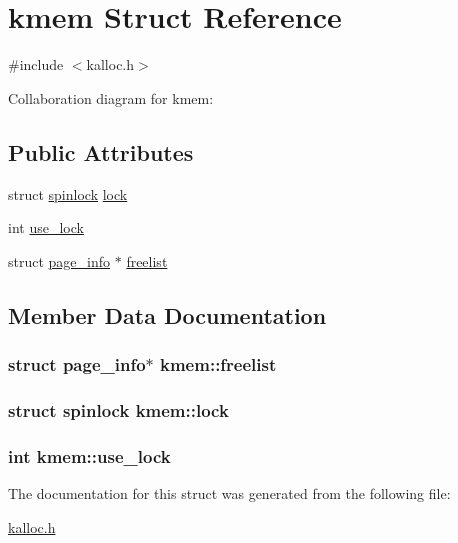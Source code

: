 \hypertarget{structkmem}{}\section{kmem Struct Reference}
\label{structkmem}


{\ttfamily \#include $<$kalloc.\+h$>$}



Collaboration diagram for kmem\+:
\subsection*{Public Attributes}
\begin{DoxyCompactItemize}
\item 
struct \hyperlink{structspinlock}{spinlock} \hyperlink{structkmem_ab98bb7fcf1d4f52b841ff0019dd440b4}{lock}
\item 
int \hyperlink{structkmem_a877cadf832ccc6da9d494cff0c115959}{use\+\_\+lock}
\item 
struct \hyperlink{structpage__info}{page\+\_\+info} $\ast$ \hyperlink{structkmem_aad0e60274b8c0d99e8e54ef1aca231b7}{freelist}
\end{DoxyCompactItemize}


\subsection{Member Data Documentation}
\subsubsection[{\texorpdfstring{freelist}{freelist}}]{\setlength{\rightskip}{0pt plus 5cm}struct {\bf page\+\_\+info}$\ast$ kmem\+::freelist}\hypertarget{structkmem_aad0e60274b8c0d99e8e54ef1aca231b7}{}\label{structkmem_aad0e60274b8c0d99e8e54ef1aca231b7}
\subsubsection[{\texorpdfstring{lock}{lock}}]{\setlength{\rightskip}{0pt plus 5cm}struct {\bf spinlock} kmem\+::lock}\hypertarget{structkmem_ab98bb7fcf1d4f52b841ff0019dd440b4}{}\label{structkmem_ab98bb7fcf1d4f52b841ff0019dd440b4}
\subsubsection[{\texorpdfstring{use\+\_\+lock}{use_lock}}]{\setlength{\rightskip}{0pt plus 5cm}int kmem\+::use\+\_\+lock}\hypertarget{structkmem_a877cadf832ccc6da9d494cff0c115959}{}\label{structkmem_a877cadf832ccc6da9d494cff0c115959}


The documentation for this struct was generated from the following file\+:\begin{DoxyCompactItemize}
\item 
\hyperlink{kalloc_8h}{kalloc.\+h}\end{DoxyCompactItemize}
